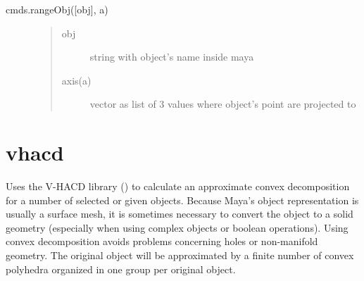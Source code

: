 \documentclass[letterpaper,10pt,english]{sphinxmanual}
\begin{document}
 cmds.rangeObj({[}obj{]}, a)
\begin{description}
\item[{}] \leavevmode\begin{quote}\begin{description}
\item[{obj}] \leavevmode
string with object’s name inside maya

\item[{axis(a)}] \leavevmode
vector as list of 3 values where object’s point are projected to

\end{description}\end{quote}

\item[{}] \leavevmode
\begin{sphinxVerbatim}[commandchars=\\\{\}]
  \PYG{p}{[}\PYG{p}{]}
\end{sphinxVerbatim}

\end{description}


\section{vhacd}
\label{\detokenize{pk_src.vhacd:vhacd}}\label{\detokenize{pk_src.vhacd::doc}}\label{\detokenize{pk_src.vhacd:id1}}
{\hyperref[\detokenize{index:commands}]{}}
\label{\detokenize{pk_src.vhacd:module-pk_src.vhacd}}
Uses the V-HACD library () to calculate an approximate convex decomposition for a number of selected or given objects. Because Maya’s object representation is usually a surface mesh, it is sometimes necessary to convert the object to a solid geometry (especially when using complex objects or boolean operations). Using convex decomposition avoids problems concerning holes or non-manifold geometry. The original object will be approximated by a finite number of convex polyhedra organized in one group per original object.
\end{document}
